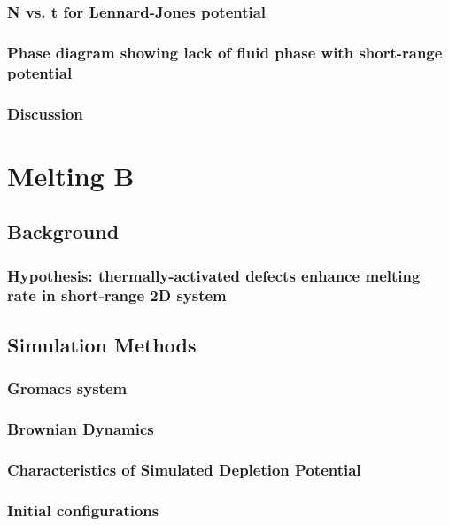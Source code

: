 \documentclass{article}
\begin{document}
{\subsubsection{ N vs. t for Lennard-Jones potential}

\subsubsection{ Phase diagram showing lack of fluid phase with short-range potential}


\subsubsection{Discussion}

\section{Melting B}

\subsection{Background}

\subsubsection{Hypothesis: thermally-activated defects enhance melting rate in short-range 2D system}

\subsection{Simulation Methods}

\subsubsection{Gromacs system}

\subsubsection{Brownian Dynamics}

\subsubsection{Characteristics of Simulated Depletion Potential}

\subsubsection{Initial configurations}

}
\end{document}
